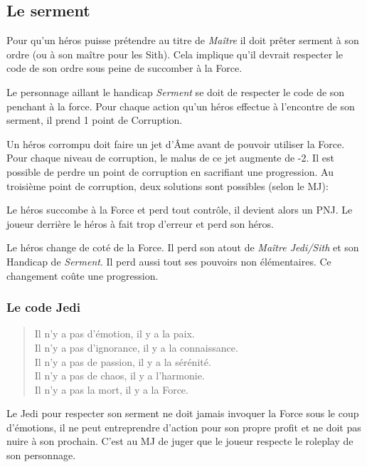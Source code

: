 \subsection{Le serment}
\label{sec:force-serment}
Pour qu’un héros puisse prétendre au titre de \emph{Maître} il doit prêter serment à son ordre (ou à son maître pour les Sith). Cela implique qu’il devrait respecter le code de son ordre sous peine de succomber à la Force.

Le personnage aillant le handicap \emph{Serment} se doit de respecter le code de son penchant à la force. Pour chaque action qu’un héros effectue à l’encontre de son serment, il prend 1 point de Corruption. 

Un héros corrompu doit faire un jet d’\^Ame avant de pouvoir utiliser la Force. Pour chaque niveau de corruption, le malus de ce jet augmente de -2. Il est possible de perdre un point de corruption en sacrifiant une progression. Au troisième point de corruption, deux solutions sont possibles (selon le MJ):

\begin{description}[align=left] 
    \item [Perte de contrôle]
        Le héros succombe à la Force et perd tout contrôle, il devient alors un PNJ. Le joueur derrière le héros à fait trop d’erreur et perd son héros.

    \item [Changement de coté]
    	Le héros change de coté de la Force. Il perd son atout de \emph{Maître Jedi/Sith} et son Handicap de \emph{Serment}. Il perd aussi tout ses pouvoirs non élémentaires. Ce changement coûte une progression.
\end{description}

\subsubsection{Le code Jedi}
\begin{quote}
Il n’y a pas d’émotion, il y a la paix. \\
Il n’y a pas d’ignorance, il y a la connaissance. \\ 
Il n’y a pas de passion, il y a la sérénité. \\ 
Il n’y a pas de chaos, il y a l’harmonie. \\ 
Il n’y a pas la mort, il y a la Force. 
\end{quote}

Le Jedi pour respecter son serment ne doit jamais invoquer la Force sous le coup d’émotions, il ne peut entreprendre d’action pour son propre profit et ne doit pas nuire à son prochain. C’est au MJ de juger que le joueur respecte le roleplay de son personnage.

